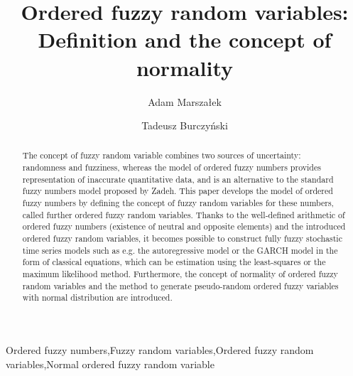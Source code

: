 \documentclass[review]{elsarticle}
\theoremstyle{definition}
\theoremstyle{theorem}
\begin{document}
\begin{frontmatter}

\title{Ordered fuzzy random variables: Definition and the concept of normality}



\author[pk]{Adam Marsza\l ek}

\author[pk,ippt]{Tadeusz Burczy\'{n}ski}


\address[pk]{Institute of Computer Science, Computational Intelligence Department, Cracow University of Technology, Cracow, Poland}
\address[ippt]{Institute of Fundamental Technological Research, Polish Academy of Sciences, Warsaw, Poland}

\begin{abstract}
The concept of fuzzy random variable combines two sources of uncertainty: randomness and fuzziness, whereas the model of ordered fuzzy numbers provides representation of inaccurate quantitative data, and is an alternative to the standard fuzzy numbers model proposed by Zadeh. This paper develops the model of ordered fuzzy numbers by defining the concept of fuzzy random variables for these numbers, called further ordered fuzzy random variables. Thanks to the well-defined arithmetic of ordered fuzzy numbers (existence of neutral and opposite elements) and the introduced ordered fuzzy random variables, it becomes possible to construct fully fuzzy stochastic time series models such as e.g. the autoregressive model or the GARCH model in the form of classical equations, which can be estimation using the least-squares or the maximum likelihood method. Furthermore, the concept of normality of ordered fuzzy random variables and the method to generate pseudo-random ordered fuzzy variables  with normal distribution are introduced.
\end{abstract}

\begin{keyword}
Ordered fuzzy numbers\sep Fuzzy random variables\sep Ordered fuzzy random variables\sep Normal ordered fuzzy random variable
\end{keyword}

\end{frontmatter}

\linenumbers
\end{document}
